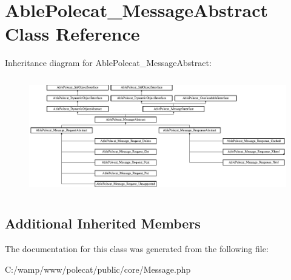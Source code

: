 \hypertarget{class_able_polecat___message_abstract}{}\section{Able\+Polecat\+\_\+\+Message\+Abstract Class Reference}
\label{class_able_polecat___message_abstract}
Inheritance diagram for Able\+Polecat\+\_\+\+Message\+Abstract\+:\begin{figure}[H]
\begin{center}
\leavevmode
\includegraphics[height=5.090909cm]{class_able_polecat___message_abstract}
\end{center}
\end{figure}
\subsection*{Additional Inherited Members}


The documentation for this class was generated from the following file\+:\begin{DoxyCompactItemize}
\item 
C\+:/wamp/www/polecat/public/core/Message.\+php\end{DoxyCompactItemize}
